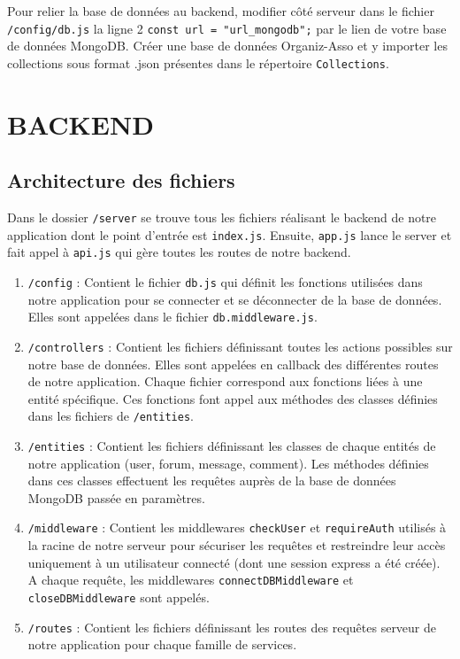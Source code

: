 \documentclass{article}
\begin{document}
Pour relier la base de données au backend, modifier côté serveur dans le fichier \texttt{/config/db.js} la ligne 2 \texttt{const url = "url\_mongodb";} par le lien de votre base de données MongoDB. Créer une base de données Organiz-Asso et y importer les collections sous format .json présentes dans le répertoire \texttt{Collections}.

\section{BACKEND}

\subsection*{Architecture des fichiers}
Dans le dossier \texttt{/server} se trouve tous les fichiers réalisant le backend de notre application dont le point d'entrée est \texttt{index.js}. Ensuite, \texttt{app.js} lance le server et fait appel à \texttt{api.js} qui gère toutes les routes de notre backend.

\begin{enumerate}
    \item \texttt{/config} : Contient le fichier \texttt{db.js} qui définit les fonctions utilisées dans notre application pour se connecter et se déconnecter de la base de données. Elles sont appelées dans le fichier \texttt{db.middleware.js}.
    \item \texttt{/controllers} : Contient les fichiers définissant toutes les actions possibles sur notre base de données. Elles sont appelées en callback des différentes routes de notre application. Chaque fichier correspond aux fonctions liées à une entité spécifique. Ces fonctions font appel aux méthodes des classes définies dans les fichiers de \texttt{/entities}.
    \item \texttt{/entities} : Contient les fichiers définissant les classes de chaque entités de notre application (user, forum, message, comment). Les méthodes définies dans ces classes effectuent les requêtes auprès de la base de données MongoDB passée en paramètres.
    \item \texttt{/middleware} : Contient les middlewares \texttt{checkUser} et \texttt{requireAuth} utilisés à la racine de notre serveur pour sécuriser les requêtes et restreindre leur accès uniquement à un utilisateur connecté (dont une session express a été créée). A chaque requête, les middlewares \texttt{connectDBMiddleware} et \texttt{closeDBMiddleware} sont appelés.
    \item \texttt{/routes} : Contient les fichiers définissant les routes des requêtes serveur de notre application pour chaque famille de services.
\end{enumerate}
\end{document}
